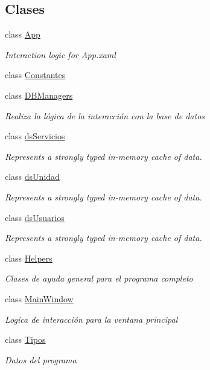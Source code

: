 \subsection*{Clases}
\begin{DoxyCompactItemize}
\item 
class \hyperlink{class_proyecto___integrador__3_1_1_app}{App}
\begin{DoxyCompactList}\small\item\em Interaction logic for App.\-xaml \end{DoxyCompactList}\item 
class \hyperlink{class_proyecto___integrador__3_1_1_constantes}{Constantes}
\item 
class \hyperlink{class_proyecto___integrador__3_1_1_d_b_managers}{D\-B\-Managers}
\begin{DoxyCompactList}\small\item\em Realiza la lógica de la interacción con la base de datos \end{DoxyCompactList}\item 
class \hyperlink{class_proyecto___integrador__3_1_1ds_servicios}{ds\-Servicios}
\begin{DoxyCompactList}\small\item\em Represents a strongly typed in-\/memory cache of data. \end{DoxyCompactList}\item 
class \hyperlink{class_proyecto___integrador__3_1_1ds_unidad}{ds\-Unidad}
\begin{DoxyCompactList}\small\item\em Represents a strongly typed in-\/memory cache of data. \end{DoxyCompactList}\item 
class \hyperlink{class_proyecto___integrador__3_1_1ds_usuarios}{ds\-Usuarios}
\begin{DoxyCompactList}\small\item\em Represents a strongly typed in-\/memory cache of data. \end{DoxyCompactList}\item 
class \hyperlink{class_proyecto___integrador__3_1_1_helpers}{Helpers}
\begin{DoxyCompactList}\small\item\em Clases de ayuda general para el programa completo \end{DoxyCompactList}\item 
class \hyperlink{class_proyecto___integrador__3_1_1_main_window}{Main\-Window}
\begin{DoxyCompactList}\small\item\em Logica de interacción para la ventana principal \end{DoxyCompactList}\item 
class \hyperlink{class_proyecto___integrador__3_1_1_tipos}{Tipos}
\begin{DoxyCompactList}\small\item\em Datos del programa \end{DoxyCompactList}\end{DoxyCompactItemize}
